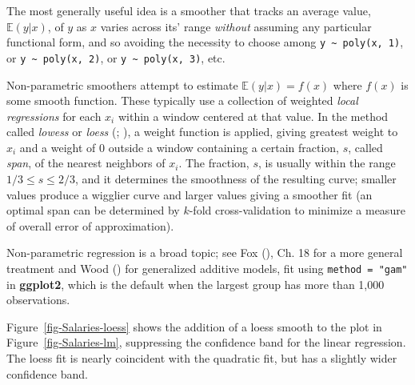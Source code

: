 \documentclass[
  letterpaper,
  10pt,
  krantz2]{krantz}
\begin{document}
The most generally useful idea is a smoother that tracks an average
value, \(\mathbb{E} (y | x)\), of \(y\) as \(x\) varies across its'
range \emph{without} assuming any particular functional form, and so
avoiding the necessity to choose among
\texttt{y\ \textasciitilde{}\ poly(x,\ 1)}, or
\texttt{y\ \textasciitilde{}\ poly(x,\ 2)}, or
\texttt{y\ \textasciitilde{}\ poly(x,\ 3)}, etc.

Non-parametric smoothers attempt to estimate
\(\mathbb{E} (y | x) = f(x)\) where \(f(x)\) is some smooth function.
These typically use a collection of weighted \emph{local regressions}
for each \(x_i\) within a window centered at that value. In the method
called \emph{lowess} or \emph{loess}
(;
), a weight
function is applied, giving greatest weight to \(x_i\) and a weight of 0
outside a window containing a certain fraction, \(s\), called
\emph{span}, of the nearest neighbors of \(x_i\). The fraction, \(s\),
is usually within the range \(1/3 \le s \le 2/3\), and it determines the
smoothness of the resulting curve; smaller values produce a wigglier
curve and larger values giving a smoother fit (an optimal span can be
determined by \(k\)-fold cross-validation to minimize a measure of
overall error of approximation).

Non-parametric regression is a broad topic; see Fox
(), Ch. 18 for a more general treatment
and Wood () for generalized additive
models, fit using \texttt{method\ =\ "gam"} in \textbf{ggplot2}, which
is the default when the largest group has more than 1,000 observations.

Figure~\ref{fig-Salaries-loess} shows the addition of a loess smooth to
the plot in Figure~\ref{fig-Salaries-lm}, suppressing the confidence
band for the linear regression. The loess fit is nearly coincident with
the quadratic fit, but has a slightly wider confidence band.
\end{document}
